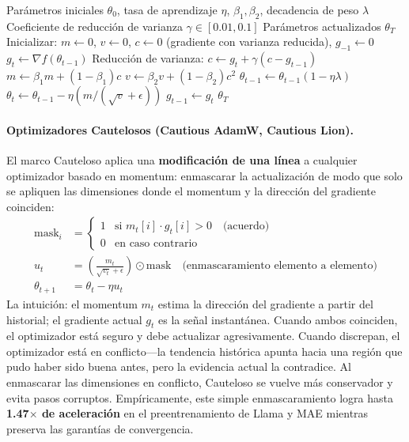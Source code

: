 \begin{algorithm}[H]
\caption{MARS (Haciendo Brillar las Tasas de Aprendizaje Adaptativas)}
\label{alg:mars}
\begin{algorithmic}[1]
\Require Parámetros iniciales $\theta_0$, tasa de aprendizaje $\eta$, $\beta_1, \beta_2$, decadencia de peso $\lambda$
\Require Coeficiente de reducción de varianza $\gamma \in [0.01, 0.1]$
\Ensure Parámetros actualizados $\theta_T$
\State Inicializar: $m \gets 0$, $v \gets 0$, $c \gets 0$ (gradiente con varianza reducida), $g_{-1} \gets 0$
    \State $g_t \gets \nabla f(\theta_{t-1})$
    \State Reducción de varianza: $c \gets g_t + \gamma(c - g_{t-1})$
    \State $m \gets \beta_1 m + (1-\beta_1) c$
    \State $v \gets \beta_2 v + (1-\beta_2) c^2$
        \State $\theta_{t-1} \gets \theta_{t-1}(1 - \eta\lambda)$
    \EndIf
    \State $\theta_t \gets \theta_{t-1} - \eta (m / (\sqrt{v} + \epsilon))$
    \State $g_{t-1} \gets g_t$
\EndFor
\Return $\theta_T$
\end{algorithmic}
\end{algorithm}

\paragraph{Optimizadores Cautelosos (Cautious AdamW, Cautious Lion).}
El marco Cauteloso aplica una \textbf{modificación de una línea} a cualquier optimizador basado en momentum: enmascarar la actualización de modo que solo se apliquen las dimensiones donde el momentum y la dirección del gradiente coinciden:
\begin{align}
\text{mask}_i &= \begin{cases} 1 & \text{si } m_t[i] \cdot g_t[i] > 0 \quad\text{(acuerdo)} \\ 0 & \text{en caso contrario} \end{cases} \\
u_t &= \left(\frac{m_t}{\sqrt{v_t}+\epsilon}\right) \odot \text{mask} \quad\text{(enmascaramiento elemento a elemento)} \\
\theta_{t+1} &= \theta_t - \eta u_t
\end{align}
La intuición: el momentum $m_t$ estima la dirección del gradiente a partir del historial; el gradiente actual $g_t$ es la señal instantánea. Cuando ambos coinciden, el optimizador está seguro y debe actualizar agresivamente. Cuando discrepan, el optimizador está en conflicto---la tendencia histórica apunta hacia una región que pudo haber sido buena antes, pero la evidencia actual la contradice. Al enmascarar las dimensiones en conflicto, Cauteloso se vuelve más conservador y evita pasos corruptos. Empíricamente, este simple enmascaramiento logra hasta \textbf{1.47$\times$ de aceleración} en el preentrenamiento de Llama y MAE mientras preserva las garantías de convergencia.

